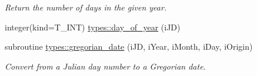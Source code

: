 \begin{DoxyCompactItemize}
\begin{DoxyCompactList}\small\item\em Return the number of days in the given year. \item\end{DoxyCompactList}\item 
integer(kind=T\_\-INT) \hyperlink{namespacetypes_a08910935abbfabf0c927ac7bc6f8b36a}{types::day\_\-of\_\-year} (iJD)
\item 
subroutine \hyperlink{namespacetypes_ae7e76a43f7773d483dbf9814b78ed2b3}{types::gregorian\_\-date} (iJD, iYear, iMonth, iDay, iOrigin)
\begin{DoxyCompactList}\small\item\em Convert from a Julian day number to a Gregorian date. \item\end{DoxyCompactList}\end{DoxyCompactItemize}

